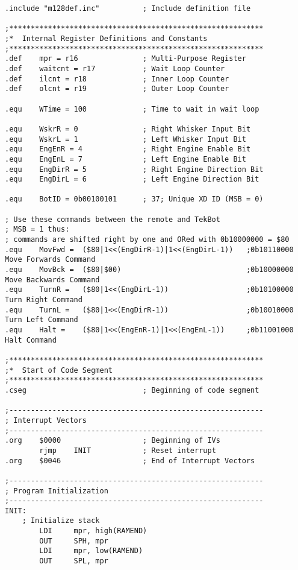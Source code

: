 \documentclass[12pt,letterpaper]{article}
\begin{document}
\begin{verbatim}
.include "m128def.inc"          ; Include definition file

;***********************************************************
;*  Internal Register Definitions and Constants
;***********************************************************
.def    mpr = r16               ; Multi-Purpose Register
.def    waitcnt = r17           ; Wait Loop Counter
.def    ilcnt = r18             ; Inner Loop Counter
.def    olcnt = r19             ; Outer Loop Counter

.equ    WTime = 100             ; Time to wait in wait loop

.equ    WskrR = 0               ; Right Whisker Input Bit
.equ    WskrL = 1               ; Left Whisker Input Bit
.equ    EngEnR = 4              ; Right Engine Enable Bit
.equ    EngEnL = 7              ; Left Engine Enable Bit
.equ    EngDirR = 5             ; Right Engine Direction Bit
.equ    EngDirL = 6             ; Left Engine Direction Bit

.equ    BotID = 0b00100101      ; 37; Unique XD ID (MSB = 0)

; Use these commands between the remote and TekBot
; MSB = 1 thus:
; commands are shifted right by one and ORed with 0b10000000 = $80
.equ    MovFwd =  ($80|1<<(EngDirR-1)|1<<(EngDirL-1))   ;0b10110000 Move Forwards Command
.equ    MovBck =  ($80|$00)                             ;0b10000000 Move Backwards Command
.equ    TurnR =   ($80|1<<(EngDirL-1))                  ;0b10100000 Turn Right Command
.equ    TurnL =   ($80|1<<(EngDirR-1))                  ;0b10010000 Turn Left Command
.equ    Halt =    ($80|1<<(EngEnR-1)|1<<(EngEnL-1))     ;0b11001000 Halt Command

;***********************************************************
;*  Start of Code Segment
;***********************************************************
.cseg                           ; Beginning of code segment

;-----------------------------------------------------------
; Interrupt Vectors
;-----------------------------------------------------------
.org    $0000                   ; Beginning of IVs
        rjmp    INIT            ; Reset interrupt
.org    $0046                   ; End of Interrupt Vectors

;-----------------------------------------------------------
; Program Initialization
;-----------------------------------------------------------
INIT:
    ; Initialize stack
        LDI     mpr, high(RAMEND)
        OUT     SPH, mpr
        LDI     mpr, low(RAMEND)
        OUT     SPL, mpr


\end{verbatim}
\end{document}
